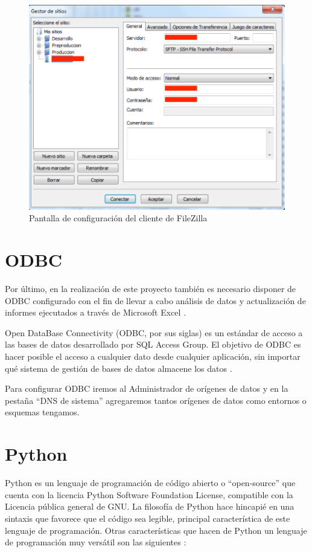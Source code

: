 \documentclass[a4paper, 12pt]{book}
\begin{document}
\begin{figure}
   \centering
   \includegraphics[width=12cm, keepaspectratio]{img/filezillaconfig}
   \caption{Pantalla de configuración del cliente de FileZilla}
   \label{fig:FileZilla_Config}
\end{figure}

\section{ODBC}
\label{sec:ODBC}
Por último, en la realización de este proyecto también es necesario disponer de ODBC configurado con el fin de llevar a cabo análisis de datos y actualización de informes ejecutados a través de Microsoft Excel \cite{microsoft_odbc}.

Open DataBase Connectivity (ODBC, por sus siglas) es un estándar de acceso a las bases de datos desarrollado por SQL Access Group. El objetivo de ODBC es hacer posible el acceso a cualquier dato desde cualquier aplicación, sin importar qué sistema de gestión de bases de datos almacene los datos \cite{alexandruaccess,odbc}.

Para configurar ODBC iremos al Administrador de orígenes de datos y en la pestaña “DNS de sistema” agregaremos tantos orígenes de datos como entornos o esquemas tengamos.

\section{Python}
\label{sec:Python}
Python es un lenguaje de programación de código abierto o “open-source” que cuenta con la licencia Python Software Foundation License, compatible con la Licencia pública general de GNU. La filosofía de Python hace hincapié en una sintaxis que favorece que el código sea legible, principal característica de este lenguaje de programación. Otras características que hacen de Python un lenguaje de programación muy versátil son las siguientes \cite{python01,python02,python03}:
\end{document}
